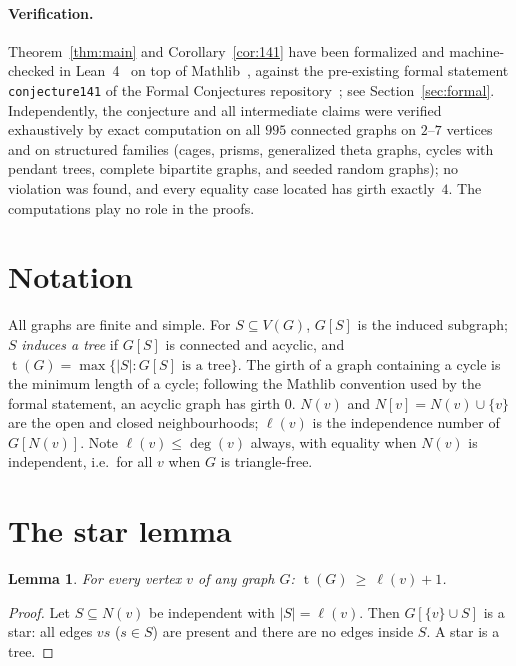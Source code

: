 \documentclass[11pt]{article}
\numberwithin{equation}{section}
\newtheorem{lemma}[theorem]{Lemma}
\theoremstyle{remark}
\newcommand{\tr}{\operatorname{t}}
\newcommand{\lv}{\ell}
\begin{document}
\paragraph{Verification.}
Theorem~\ref{thm:main} and Corollary~\ref{cor:141} have been formalized and
machine-checked in Lean~4~\cite{Lean4} on top of Mathlib~\cite{mathlib},
against the pre-existing formal statement \texttt{conjecture141} of the
Formal Conjectures repository~\cite{FC141}; see Section~\ref{sec:formal}.
Independently, the conjecture and all intermediate claims were verified
exhaustively by exact computation on all $995$ connected graphs on $2$--$7$
vertices and on structured families (cages, prisms, generalized theta graphs,
cycles with pendant trees, complete bipartite graphs, and seeded random
graphs); no violation was found, and every equality case located has girth
exactly~$4$.  The computations play no role in the proofs.

\section{Notation}

All graphs are finite and simple.  For $S\subseteq V(G)$, $G[S]$ is the
induced subgraph; $S$ \emph{induces a tree} if $G[S]$ is connected and
acyclic, and $\tr(G)=\max\{|S|:G[S]\text{ is a tree}\}$.  The girth of a
graph containing a cycle is the minimum length of a cycle; following the
Mathlib convention used by the formal statement, an acyclic graph has girth
$0$.  $N(v)$ and $N[v]=N(v)\cup\{v\}$ are the open and closed
neighbourhoods; $\lv(v)$ is the independence number of $G[N(v)]$.  Note
$\lv(v)\le\deg(v)$ always, with equality when $N(v)$ is independent, i.e.\
for all $v$ when $G$ is triangle-free.

\section{The star lemma}

\begin{lemma}\label{lem:star}
For every vertex $v$ of any graph $G$: $\tr(G)\ \ge\ \lv(v)+1$.
\end{lemma}

\begin{proof}
Let $S\subseteq N(v)$ be independent with $|S|=\lv(v)$.  Then
$G[\{v\}\cup S]$ is a star: all edges $vs$ ($s\in S$) are present and there
are no edges inside $S$.  A star is a tree.
\end{proof}
\end{document}

